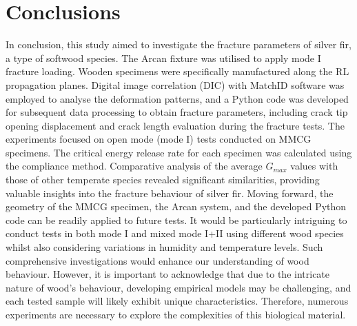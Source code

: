 \documentclass[3p,times,procedia]{elsarticle}
\begin{document}

\section{Conclusions}\label{S:con}

In conclusion, this study aimed to investigate the fracture parameters of silver fir, a type of softwood species. The Arcan fixture was utilised to apply mode I fracture loading. Wooden specimens were specifically manufactured along the RL propagation planes. Digital image correlation (DIC) with MatchID software was employed to analyse the deformation patterns, and a Python code was developed for subsequent data processing to obtain fracture parameters, including crack tip opening displacement and crack length evaluation during the fracture tests.
The experiments focused on open mode (mode I) tests conducted on MMCG specimens. The critical energy release rate for each specimen was calculated using the compliance method. Comparative analysis of the average $G_{max}$ values with those of other temperate species revealed significant similarities, providing valuable insights into the fracture behaviour of silver fir.
Moving forward, the geometry of the MMCG specimen, the Arcan system, and the developed Python code can be readily applied to future tests. It would be particularly intriguing to conduct tests in both mode I and mixed mode I+II using different wood species whilst also considering variations in humidity and temperature levels. Such comprehensive investigations would enhance our understanding of wood behaviour. However, it is important to acknowledge that due to the intricate nature of wood's behaviour, developing empirical models may be challenging, and each tested sample will likely exhibit unique characteristics. Therefore, numerous experiments are necessary to explore the complexities of this biological material.
\end{document}
